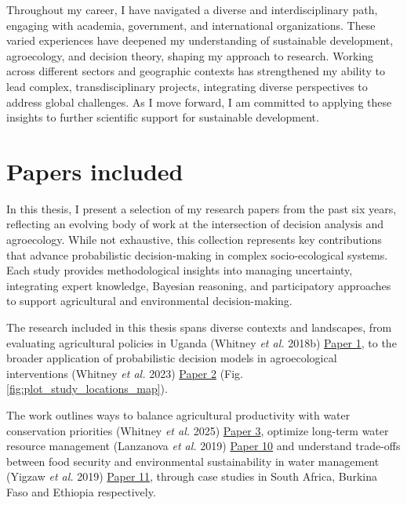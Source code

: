 \documentclass[
]{article}
\begin{document}
Throughout my career, I have navigated a diverse and interdisciplinary
path, engaging with academia, government, and international
organizations. These varied experiences have deepened my understanding
of sustainable development, agroecology, and decision theory, shaping my
approach to research. Working across different sectors and geographic
contexts has strengthened my ability to lead complex, transdisciplinary
projects, integrating diverse perspectives to address global challenges.
As I move forward, I am committed to applying these insights to further
scientific support for sustainable development.

\newpage

\hypertarget{papers-included}{%
\section*{Papers included}\label{papers-included}}

In this thesis, I present a selection of my research papers from the
past six years, reflecting an evolving body of work at the intersection
of decision analysis and agroecology. While not exhaustive, this
collection represents key contributions that advance probabilistic
decision-making in complex socio-ecological systems. Each study provides
methodological insights into managing uncertainty, integrating expert
knowledge, Bayesian reasoning, and participatory approaches to support
agricultural and environmental decision-making.

The research included in this thesis spans diverse contexts and
landscapes, from evaluating agricultural policies in Uganda (Whitney
\emph{et al.} 2018b)
\protect\hyperlink{whitney_probabilistic_2018}{Paper 1}, to the broader
application of probabilistic decision models in agroecological
interventions (Whitney \emph{et al.} 2023)
\protect\hyperlink{whitney_decision_2023}{Paper 2} (Fig.
\ref{fig:plot_study_locations_map}).

The work outlines ways to balance agricultural productivity with water
conservation priorities (Whitney \emph{et al.} 2025)
\protect\hyperlink{whitney_balancing_2025}{Paper 3}, optimize long-term
water resource management (Lanzanova \emph{et al.} 2019)
\protect\hyperlink{lanzanova_improving_2019}{Paper 10} and understand
trade-offs between food security and environmental sustainability in
water management (Yigzaw \emph{et al.} 2019)
\protect\hyperlink{yigzaw_stochastic_2019}{Paper 11}, through case
studies in South Africa, Burkina Faso and Ethiopia respectively.
\end{document}
